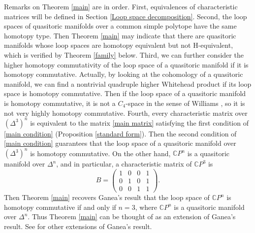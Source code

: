 \documentclass[a4paper]{amsart}
\numberwithin{equation}{section}
\theoremstyle{definition}
\theoremstyle{remark}
\numberwithin{equation}{section}
\newcommand{\C}{\mathbb{C}}
\begin{document}
Remarks on Theorem \ref{main} are in order. First, equivalences of characteristic matrices will be defined in Section \ref{Loop space decomposition}. Second, the loop spaces of quasitoric manifolds over a common simple polytope have the same homotopy type. Then Theorem \ref{main} may indicate that there are quasitoric manifolds whose loop spaces are homotopy equivalent but not H-equivalent, which is verified by Theorem \ref{family} below. Third, we can further consider the higher homotopy commutativity of the loop space of a quasitoric manifold if it is homotopy commutative. Actually, by looking at the cohomology of a quasitoric manifold, we can find a nontrivial quadruple higher Whitehead product if its loop space is homotopy commutative. Then if the loop space of a quasitoric manifold is homotopy commutative, it is not a $C_4$-space in the sense of Williams \cite{W}, so it is not very highly homotopy commutative. Fourth, every characteristic matrix over $(\Delta^3)^n$ is equivalent to the matrix \eqref{main matrix} satisfying the first condition of \eqref{main condition} (Proposition \ref{standard form}). Then the second condition of \eqref{main condition} guarantees that the loop space of a quasitoric manifold over $(\Delta^3)^n$ is homotopy commutative. On the other hand, $\C P^n$ is a quasitoric manifold over $\Delta^n$, and in particular, a characteristic matrix of $\C P^3$ is
\begin{equation}
  \label{B}
  B=
  \begin{pmatrix}
    1&0&0&1\\
    0&1&0&1\\
    0&0&1&1
  \end{pmatrix}.
\end{equation}
Then Theorem \ref{main} recovers Ganea's result \cite{G} that the loop space of $\C P^n$ is homotopy commutative if and only if $n=3$, where $\C P^n$ is a quasitoric manifold over $\Delta^n$. Thus Theorem \ref{main} can be thought of as an extension of Ganea's result. See \cite{KMMT,KTT} for other extensions of Ganea's result.
\end{document}
